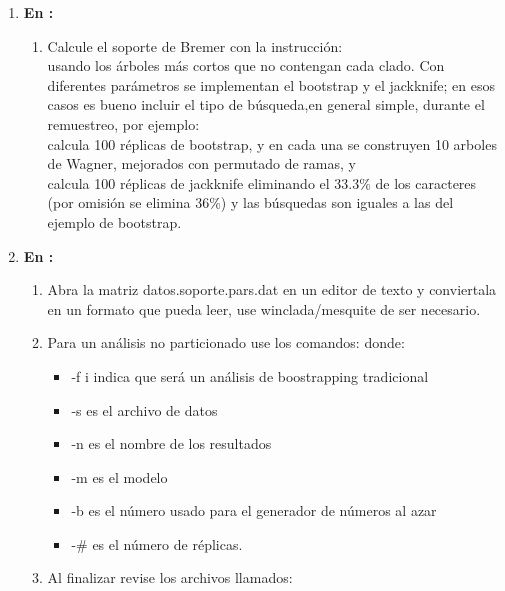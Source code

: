 \begin{enumerate}
\item \textbf{En :}
	\begin{enumerate}
		\item Calcule el soporte de Bremer con la instrucci\'on:
		\\ 
		usando los \'arboles m\'as cortos que no contengan cada clado. Con diferentes par\'ametros se implementan el bootstrap y el jackknife; en esos casos es bueno incluir el tipo de b\'usqueda,en general simple, durante el remuestreo, por ejemplo: 
		\\ 
		calcula 100 r\'eplicas de bootstrap, y en cada una se construyen 10 arboles de Wagner, mejorados con permutado de ramas, y 
		\\
		calcula 100 r\'eplicas de jackknife eliminando el 33.3\% de los caracteres (por omisi\'on se elimina 36\%) y las b\'usquedas son iguales a las del ejemplo de bootstrap.
	\end{enumerate}



\item \textbf{En :}
	\begin{enumerate}
	\item  Abra la matriz datos.soporte.pars.dat en un editor de texto y conviertala en un formato que  pueda leer, use winclada/mesquite de ser necesario.
	\item Para un an\'alisis no particionado use los comandos:
	donde:
		\begin{itemize}
			\item  -f i indica que ser\'a un an\'alisis de boostrapping tradicional
			\item  -s es el archivo de datos
			\item  -n es el nombre de los resultados
			\item  -m es el modelo
			\item  -b es el n\'umero usado para el generador de n\'umeros al azar
			\item  -$\#$ es el n\'umero de r\'eplicas.
		\end{itemize}

	\item Al finalizar revise los archivos llamados:


\end{enumerate}
\end{enumerate}
